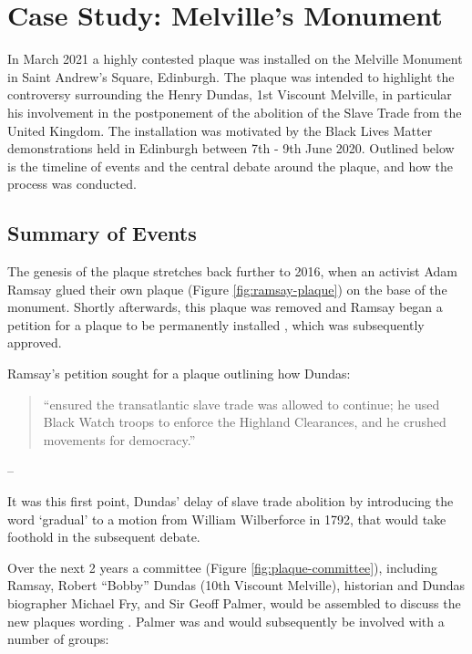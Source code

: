 \documentclass{scrartcl}
\renewcommand{\cite}{\parencite}
\begin{document}
\section{Case Study: Melville's Monument}

In March 2021 a highly contested plaque was installed on the Melville Monument in Saint Andrew's Square, Edinburgh. 
The plaque was intended to highlight the controversy surrounding the Henry Dundas, 1st Viscount Melville, in particular his involvement in the postponement of the abolition of the Slave Trade from the United Kingdom. 
The installation was motivated by the Black Lives Matter demonstrations held in Edinburgh between 7th - 9th June 2020. 
Outlined below is the timeline of events and the central debate around the plaque, and how the process was conducted.

\subsection{Summary of Events}

The genesis of the plaque stretches back further to 2016, when an activist Adam Ramsay glued their own plaque \cite{ramsay_2016} (Figure \ref{fig:ramsay-plaque}) on the base of the monument. Shortly afterwards, this plaque was removed and Ramsay began a petition for a plaque to be permanently installed \cite{council_2016}, which was subsequently approved.

Ramsay's petition sought for a plaque outlining how Dundas:

\begin{quotation}
    ``ensured the transatlantic slave trade was allowed to continue; he used Black Watch troops to enforce the Highland Clearances, and he crushed movements for democracy.''
\end{quotation} 
\begin{flushright}
-- \cite{council_2016}
\end{flushright}

It was this first point, Dundas' delay of slave trade abolition by introducing the word `gradual' to a motion from William Wilberforce in 1792, that would take foothold in the subsequent debate.

Over the next 2 years a committee (Figure \ref{fig:plaque-committee}), including Ramsay, Robert ``Bobby'' Dundas (10th Viscount Melville), historian and Dundas biographer Michael Fry, and Sir Geoff Palmer, would be assembled to discuss the new plaques wording \cite{c4n_2018}. Palmer was and would subsequently be involved with a number of groups:
\end{document}
